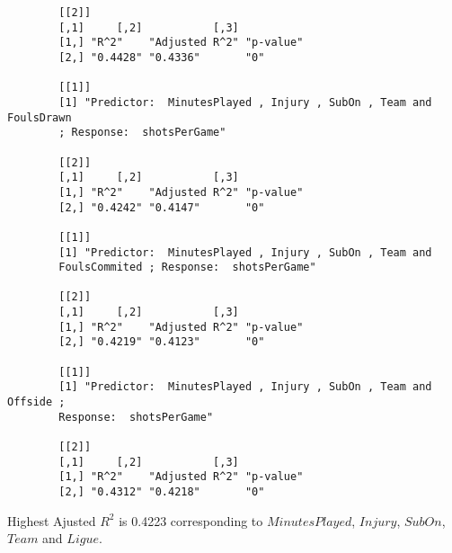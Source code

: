 \documentclass[12pt]{article}
\begin{document}
\begin{verbatim}
		[[2]]
		[,1]     [,2]           [,3]     
		[1,] "R^2"    "Adjusted R^2" "p-value"
		[2,] "0.4428" "0.4336"       "0"      
		
		[[1]]
		[1] "Predictor:  MinutesPlayed , Injury , SubOn , Team and FoulsDrawn 
		; Response:  shotsPerGame"
		
		[[2]]
		[,1]     [,2]           [,3]     
		[1,] "R^2"    "Adjusted R^2" "p-value"
		[2,] "0.4242" "0.4147"       "0"      
		
		[[1]]
		[1] "Predictor:  MinutesPlayed , Injury , SubOn , Team and 
		FoulsCommited ; Response:  shotsPerGame"
		
		[[2]]
		[,1]     [,2]           [,3]     
		[1,] "R^2"    "Adjusted R^2" "p-value"
		[2,] "0.4219" "0.4123"       "0"      
		
		[[1]]
		[1] "Predictor:  MinutesPlayed , Injury , SubOn , Team and Offside ; 
		Response:  shotsPerGame"
		
		[[2]]
		[,1]     [,2]           [,3]     
		[1,] "R^2"    "Adjusted R^2" "p-value"
		[2,] "0.4312" "0.4218"       "0"  
	\end{verbatim}
	Highest Ajusted $ R^2 $ is 0.4223 corresponding to $ MinutesPlayed $, $ Injury $, $ SubOn $, $ Team $ and $ Ligue $.
	
\end{document}
